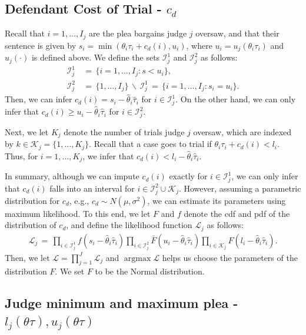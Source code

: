 \documentclass[11pt, oneside]{article}   	%
\theoremstyle{ModifiedStyle}
\DeclareMathOperator*{\argmax}{argmax}
\begin{document}
  \subsection{Defendant Cost of Trial - $c_d$}
    \label{c_d-estimation}
    Recall that $i=1,\ldots,I_j$ are the plea bargains judge $j$ oversaw, and that their sentence is given by $s_i=\min(\theta_i\tau_i+c_d(i),u_i)$, where $u_i = u_j(\theta_i\tau_i)$ and $u_j(\cdot)$ is defined above. We define the sets $\mathcal{I}_j^1$ and $\mathcal{I}_j^2$ as follows:
			\begin{align*}
				\mathcal{I}_j^1 &\,=\, \{i=1,\ldots,I_j: s < u_i\}, \\
				\mathcal{I}_j^2 &\,=\, \{1,\ldots,I_j\} \,\backslash\, \mathcal{I}_j^1 \,=\, \{i=1,\ldots,I_j:s_i=u_i\}.
			\end{align*}
			Then, we can infer $c_d(i) = s_i - \hat{\theta}_i\hat{\tau}_i$ for $i\in\mathcal{I}_j^1$. On the other hand, we can only infer that $c_d(i) \geq u_i - \hat{\theta}_i\hat{\tau}_i$ for $i\in\mathcal{I}^2_j$.

		Next, we let $K_j$ denote the number of trials judge $j$ oversaw, which are indexed by $k \in \mathcal{K}_j = \{1,\ldots,K_j\}$. Recall that a case goes to trial if $\theta_i\tau_i+c_d(i)<l_i$. Thus, for $i=1,\ldots,K_j$, we infer that $c_d(i) < l_i-\hat{\theta}_i\hat{\tau}_i$.

		In summary, although we can impute $c_d(i)$ exactly for $i\in\mathcal{I}_j^1$, we can only infer that $c_d(i)$ falls into an interval for $i\in\mathcal{I}^2_j\cup \mathcal{K}_j$. However, assuming a parametric distribution for $c_d$, e.g., $c_d \sim N(\mu,\sigma^2)$, we can estimate its parameters using maximum likelihood. To this end, we let $F$ and $f$ denote the cdf and pdf of the distribution of $c_d$, and define the likelihood function $\mathscr{L}_j$ as follows:
		\begin{align*}
			\mathscr{L}_j \,=\, \prod_{i\in\mathcal{I}_j^1} f(s_i-\hat{\theta}_i\hat{\tau}_i) \prod_{i\in\mathcal{I}_j^2} \bar{F}(u_i-\hat{\theta}_i\hat{\tau}_i) \prod_{i\in \mathcal{K}_j} F(l_i-\hat{\theta}_i\hat{\tau}_i).
		\end{align*}
		Then, we let $\mathscr{L} = \prod_{j=1}^J \mathscr{L}_j$ and $\argmax \mathscr{L}$ helps us choose the parameters of the distribution $F$. We set $F$ to be the Normal distribution.

  \subsection{Judge minimum and maximum plea - $l_j(\theta \tau),u_j(\theta \tau)$}\label{convex_hull-estimation}
\end{document}
